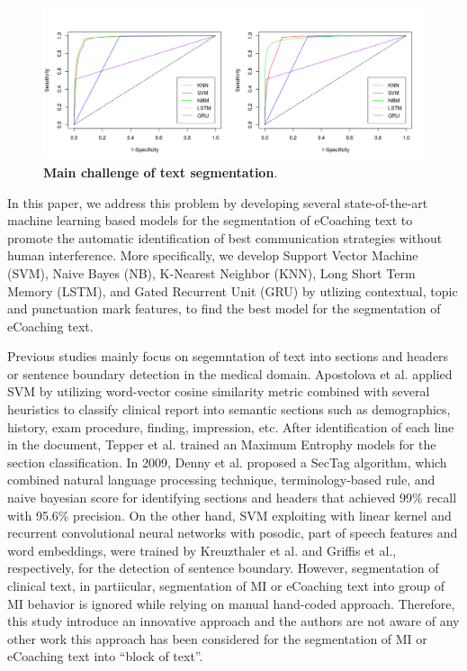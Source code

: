 \documentclass{amia}
\begin{document}
\begin{figure}[!htb]
    \centering
    \includegraphics[width=1.0\textwidth]{figures/roc-curves.png}
    \caption{\textbf{Main challenge of text segmentation}.}
    \label{fig:text-segment}
\end{figure}

In this paper, we address this problem by developing several state-of-the-art machine learning based models for the segmentation of eCoaching text to promote the automatic identification of best communication strategies without human interference. More specifically, we develop Support Vector Machine (SVM), Naive Bayes (NB), K-Nearest Neighbor (KNN), Long Short Term Memory (LSTM), and Gated Recurrent Unit (GRU) by utlizing contextual, topic and punctuation mark features, to find the best model for the segmentation of eCoaching text. 

Previous studies mainly focus on segemntation of text into sections and headers\cite{apostolova2009automatic,denny2009evaluation,tepper2012statistical,cho2002text} or sentence boundary detection\cite{griffis2016quantitative,kreuzthaler2015detection,treviso2016sentence} in the medical domain. Apostolova et al.\cite{apostolova2009automatic} applied SVM by utilizing word-vector cosine similarity metric combined with several heuristics to classify clinical report into semantic sections such as demographics, history, exam procedure, finding, impression, etc. After identification of each line in the document, Tepper et al. \cite{tepper2012statistical} trained an Maximum Entrophy models for the section classification. In 2009, Denny et al.\cite{denny2009evaluation} proposed a SecTag algorithm, which combined natural language processing technique, terminology-based rule, and naive bayesian score for identifying sections and headers that achieved 99\% recall with 95.6\% precision. On the other hand, SVM exploiting with linear kernel and recurrent convolutional neural networks with posodic, part of speech features and word embeddings, were trained by Kreuzthaler et al.\cite{kreuzthaler2015detection} and Griffis et al.\cite{griffis2016quantitative}, respectively, for the detection of sentence boundary. However, segmentation of clinical text, in partiicular, segmentation of MI or eCoaching text into group of MI behavior is ignored while relying on manual hand-coded approach. Therefore, this study introduce an innovative approach and the authors are not aware of any other work this approach has been considered for the segmentation of MI or eCoaching text into ``block of text''. 
\end{document}
